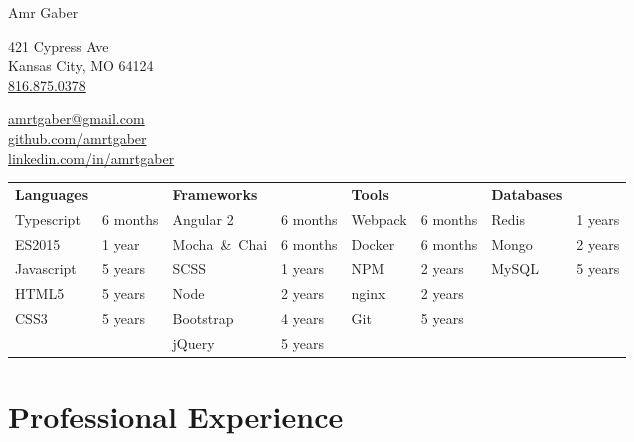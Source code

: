 \documentclass[letterpaper]{article}
\def\name{Amr Gaber}
\begin{document}
\begin{minipage}[t]{0.4\textwidth}
	\hspace{-15pt}
	{\Huge \name}  
\end{minipage}
\begin{minipage}[t]{0.3\textwidth}
  421 Cypress Ave \\
  Kansas City, MO 64124 \\
  \href{tel:+01-816-875-0378}{816.875.0378} \\
\end{minipage}
\begin{minipage}[t]{0.3\textwidth}
  \href{mailto:amrtgaber@gmail.com}{amrtgaber@gmail.com} \\
  \href{github.com/amrtgaber}{github.com/amrtgaber} \\
  \href{linkedin.com/in/amrtgaber}{linkedin.com/in/amrtgaber} \\
\end{minipage}

\begin{tabularx}{\textwidth}{ X X X X X X X X }
\textbf{Languages}  &          & \textbf{Frameworks}          &          & \textbf{Tools} &          & \textbf{Databases} &         \\
Typescript          & 6 months & Angular 2                    & 6 months & Webpack        & 6 months & Redis              & 1 years \\
ES2015              & 1 year   & \footnotesize{Mocha~\&~Chai} & 6 months & Docker         & 6 months & Mongo              & 2 years \\
Javascript          & 5 years  & SCSS                         & 1 years  & NPM            & 2 years  & MySQL              & 5 years \\
HTML5               & 5 years  & Node                         & 2 years  & nginx          & 2 years  &                    &         \\
CSS3                & 5 years  & Bootstrap                    & 4 years  & Git            & 5 years  &                    &         \\
                    &          & jQuery                       & 5 years  &                &          &                    &         \\
\end{tabularx}

\section*{\centering Professional Experience}
\end{document}

